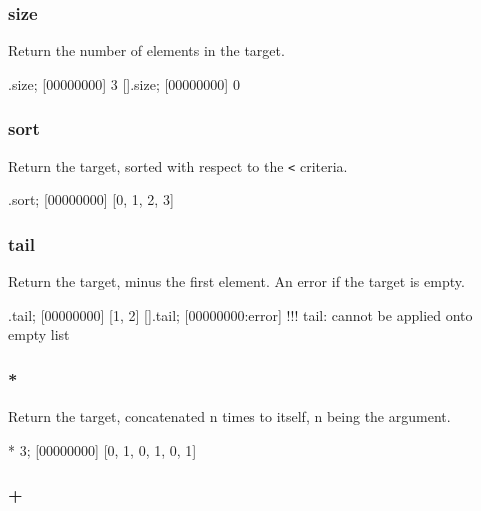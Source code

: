 \subsubsection{size}

Return the number of elements in the target.

\begin{urbiscript}[firstnumber=last]
[1, 2, 3].size;
[00000000] 3
[].size;
[00000000] 0
\end{urbiscript}

\subsubsection{sort}

Return the target, sorted with respect to the \lstinline|<| criteria.

\begin{urbiscript}[firstnumber=last]
[1, 0, 3, 2].sort;
[00000000] [0, 1, 2, 3]
\end{urbiscript}

\subsubsection{tail}

Return the target, minus the first element. An error if the target is
empty.

\begin{urbiscript}[firstnumber=last]
[0, 1, 2].tail;
[00000000] [1, 2]
[].tail;
[00000000:error] !!! tail: cannot be applied onto empty list
\end{urbiscript}

\subsubsection{*}

Return the target, concatenated n times to itself, n being the
argument.

\begin{urbiscript}[firstnumber=last]
[0, 1] * 3;
[00000000] [0, 1, 0, 1, 0, 1]
\end{urbiscript}

\subsubsection{+}

